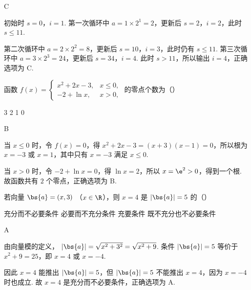 \begin{answer}
C
\end{answer}

\begin{solution}
初始时 \(s=0\)，\(i=1\). 第一次循环中 \(a=1\times2^1=2\)，更新后 \(s=2\)，\(i=2\)，此时 \(s\leqslant11\).

第二次循环中 \(a=2\times2^2=8\)，更新后 \(s=10\)，\(i=3\)，此时仍有 \(s\leqslant11\). 第三次循环中 \(a=3\times2^3=24\)，更新后 \(s=34\)，\(i=4\). 此时 \(s>11\)，所以输出 \(i=4\)，正确选项为 C.
\end{solution}

\begin{problem}
函数 \( f(x) = \begin{cases}
x^2 + 2x - 3, & x \leqslant 0,\\
-2 + \ln x, & x > 0,
\end{cases} \) 的零点个数为（\quad）

\choices
    {3}
    {2}
    {1}
    {0}
\end{problem}

\begin{answer}
B
\end{answer}

\begin{solution}
当 \(x\leqslant0\) 时，令 \(f(x)=0\)，得
\(x^2+2x-3=(x+3)(x-1)=0\)，所以根为 \(x=-3\) 或 \(x=1\)，其中只有 \(x=-3\) 满足 \(x\leqslant0\).

当 \(x>0\) 时，令 \(-2+\ln x=0\)，得 \(\ln x=2\)，所以 \(x=\e^2>0\)，得到一个根. 故函数共有 \(2\) 个零点，正确选项为 B.
\end{solution}

\begin{problem}
若向量 \(\bs{a} = (x, 3)\) （\(x \in \R\)），则 \(x = 4\) 是 \(\lvert\bs{a}\rvert = 5\) 的（\quad）

\choices
    {充分而不必要条件}
    {必要而不充分条件}
    {充要条件}
    {既不充分也不必要条件}
\end{problem}

\begin{answer}
A
\end{answer}

\begin{solution}
由向量模的定义，
\(\lvert\bs{a}\rvert=\sqrt{x^2+3^2}=\sqrt{x^2+9}\). 条件 \(\lvert\bs{a}\rvert=5\) 等价于 \(x^2+9=25\)，即 \(x=4\) 或 \(x=-4\).

因此 \(x=4\) 能推出 \(\lvert\bs{a}\rvert=5\)，但 \(\lvert\bs{a}\rvert=5\) 不能推出 \(x=4\)，因为 \(x=-4\) 时也成立. 故 \(x=4\) 是充分而不必要条件，正确选项为 A.
\end{solution}

